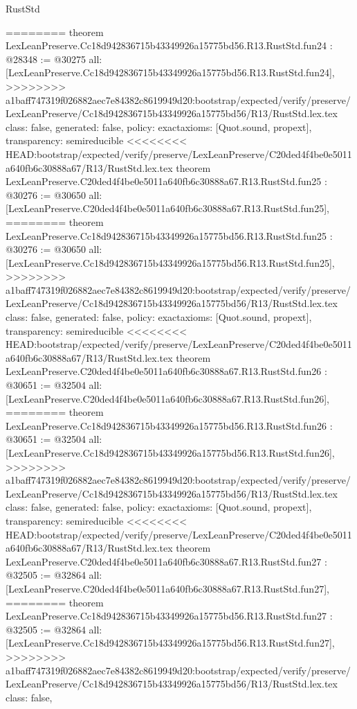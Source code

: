 \begin{lexlean}{RustStd}
\begin{coremodule}
{\begin{coremodule}
{{{{{{{{{{{{{{{{{{{{{{{{{{{========
theorem LexLeanPreserve.Cc18d942836715b43349926a15775bd56.R13.RustStd.fun24 : @28348 := @30275 {
  all: [LexLeanPreserve.Cc18d942836715b43349926a15775bd56.R13.RustStd.fun24],
>>>>>>>> a1baff747319f026882aec7e84382c8619949d20:bootstrap/expected/verify/preserve/LexLeanPreserve/Cc18d942836715b43349926a15775bd56/R13/RustStd.lex.tex
  class: false,
  generated: false,
  policy: exact{axioms: [Quot.sound, propext]},
  transparency: semireducible
}
<<<<<<<< HEAD:bootstrap/expected/verify/preserve/LexLeanPreserve/C20ded4f4be0e5011a640fb6c30888a67/R13/RustStd.lex.tex
theorem LexLeanPreserve.C20ded4f4be0e5011a640fb6c30888a67.R13.RustStd.fun25 : @30276 := @30650 {
  all: [LexLeanPreserve.C20ded4f4be0e5011a640fb6c30888a67.R13.RustStd.fun25],
========
theorem LexLeanPreserve.Cc18d942836715b43349926a15775bd56.R13.RustStd.fun25 : @30276 := @30650 {
  all: [LexLeanPreserve.Cc18d942836715b43349926a15775bd56.R13.RustStd.fun25],
>>>>>>>> a1baff747319f026882aec7e84382c8619949d20:bootstrap/expected/verify/preserve/LexLeanPreserve/Cc18d942836715b43349926a15775bd56/R13/RustStd.lex.tex
  class: false,
  generated: false,
  policy: exact{axioms: [Quot.sound, propext]},
  transparency: semireducible
}
<<<<<<<< HEAD:bootstrap/expected/verify/preserve/LexLeanPreserve/C20ded4f4be0e5011a640fb6c30888a67/R13/RustStd.lex.tex
theorem LexLeanPreserve.C20ded4f4be0e5011a640fb6c30888a67.R13.RustStd.fun26 : @30651 := @32504 {
  all: [LexLeanPreserve.C20ded4f4be0e5011a640fb6c30888a67.R13.RustStd.fun26],
========
theorem LexLeanPreserve.Cc18d942836715b43349926a15775bd56.R13.RustStd.fun26 : @30651 := @32504 {
  all: [LexLeanPreserve.Cc18d942836715b43349926a15775bd56.R13.RustStd.fun26],
>>>>>>>> a1baff747319f026882aec7e84382c8619949d20:bootstrap/expected/verify/preserve/LexLeanPreserve/Cc18d942836715b43349926a15775bd56/R13/RustStd.lex.tex
  class: false,
  generated: false,
  policy: exact{axioms: [Quot.sound, propext]},
  transparency: semireducible
}
<<<<<<<< HEAD:bootstrap/expected/verify/preserve/LexLeanPreserve/C20ded4f4be0e5011a640fb6c30888a67/R13/RustStd.lex.tex
theorem LexLeanPreserve.C20ded4f4be0e5011a640fb6c30888a67.R13.RustStd.fun27 : @32505 := @32864 {
  all: [LexLeanPreserve.C20ded4f4be0e5011a640fb6c30888a67.R13.RustStd.fun27],
========
theorem LexLeanPreserve.Cc18d942836715b43349926a15775bd56.R13.RustStd.fun27 : @32505 := @32864 {
  all: [LexLeanPreserve.Cc18d942836715b43349926a15775bd56.R13.RustStd.fun27],
>>>>>>>> a1baff747319f026882aec7e84382c8619949d20:bootstrap/expected/verify/preserve/LexLeanPreserve/Cc18d942836715b43349926a15775bd56/R13/RustStd.lex.tex
  class: false,
}}}}}}}}}}}}}}}}}}}}}}}}}}}}}}}
\end{coremodule}}
\end{coremodule}
\end{lexlean}
